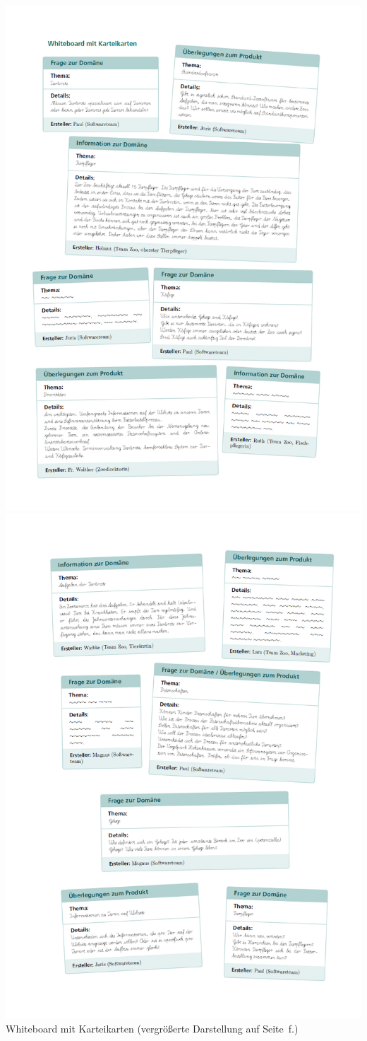 \begin{center}
	\begin{minipage}[c]{.65\linewidth}
		\centering
		\hyperref[text:lektion2_whiteboard_s1]{\includegraphics[width=0.45\linewidth]{Bilder/Zoo/whiteboard_s1.png} \includegraphics[width=0.45\linewidth]{Bilder/Zoo/whiteboard_s2.png}}
		Whiteboard mit Karteikarten (vergrößerte Darstellung auf Seite~\pageref{text:lektion2_whiteboard_s1}f.)
	\end{minipage}
	\hspace{0.1cm}%
	\begin{minipage}[c]{.33\linewidth}
		\centering

\end{minipage}
\end{center}
